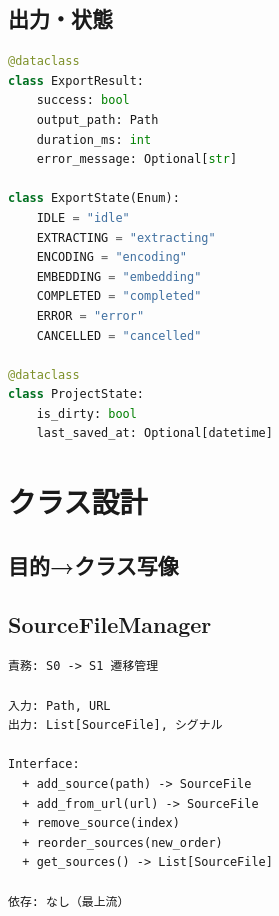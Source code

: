 \documentclass[10pt,a4paper,twocolumn]{ltjsarticle}
\begin{document}
\subsection{出力・状態}

\begin{lstlisting}[language=Python]
@dataclass
class ExportResult:
    success: bool
    output_path: Path
    duration_ms: int
    error_message: Optional[str]

class ExportState(Enum):
    IDLE = "idle"
    EXTRACTING = "extracting"
    ENCODING = "encoding"
    EMBEDDING = "embedding"
    COMPLETED = "completed"
    ERROR = "error"
    CANCELLED = "cancelled"

@dataclass
class ProjectState:
    is_dirty: bool
    last_saved_at: Optional[datetime]
\end{lstlisting}

\section{クラス設計}

\subsection{目的→クラス写像}

\vspace{0.3\baselineskip}

\subsection{SourceFileManager}

\begin{lstlisting}
責務: S0 -> S1 遷移管理

入力: Path, URL
出力: List[SourceFile], シグナル

Interface:
  + add_source(path) -> SourceFile
  + add_from_url(url) -> SourceFile
  + remove_source(index)
  + reorder_sources(new_order)
  + get_sources() -> List[SourceFile]

依存: なし（最上流）
\end{lstlisting}
\end{document}
